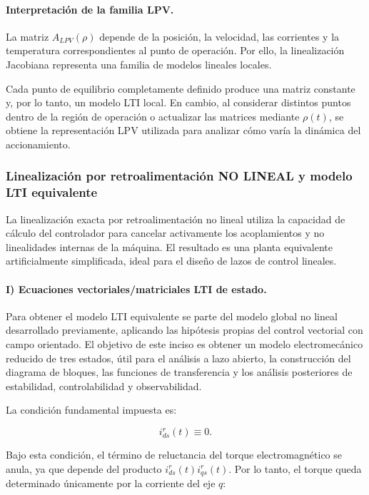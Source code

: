 \documentclass[10pt,a4paper]{article}
\begin{document}
\paragraph{Interpretación de la familia LPV.}
La matriz $A_{LPV}(\rho)$ depende de la posición, la velocidad, las corrientes y la temperatura correspondientes al punto de operación. Por ello, la linealización Jacobiana representa una familia de modelos lineales locales.

Cada punto de equilibrio completamente definido produce una matriz constante y, por lo tanto, un modelo LTI local. En cambio, al considerar distintos puntos dentro de la región de operación o actualizar las matrices mediante $\rho(t)$, se obtiene la representación LPV utilizada para analizar cómo varía la dinámica del accionamiento.


\subsubsection{Linealización por retroalimentación NO LINEAL y modelo LTI equivalente}

La linealización exacta por retroalimentación no lineal utiliza la capacidad de cálculo del controlador para cancelar activamente los acoplamientos y no linealidades internas de la máquina. 
El resultado es una planta equivalente artificialmente simplificada, ideal para el diseño de lazos de control lineales.


\paragraph{I) Ecuaciones vectoriales/matriciales LTI de estado.}
Para obtener el modelo LTI equivalente se parte del modelo global no lineal desarrollado previamente, aplicando las hipótesis propias del control vectorial con campo orientado. El objetivo de este inciso es obtener un modelo electromecánico reducido de tres estados, útil para el análisis a lazo abierto, la construcción del diagrama de bloques, las funciones de transferencia y los análisis posteriores de estabilidad, controlabilidad y observabilidad.

La condición fundamental impuesta es:

\begin{equation*}
	i_{ds}^r(t) \equiv 0.
\end{equation*}

Bajo esta condición, el término de reluctancia del torque electromagnético se anula, ya que depende del producto $i_{ds}^r(t)i_{qs}^r(t)$. Por lo tanto, el torque queda determinado únicamente por la corriente del eje $q$:
\end{document}
